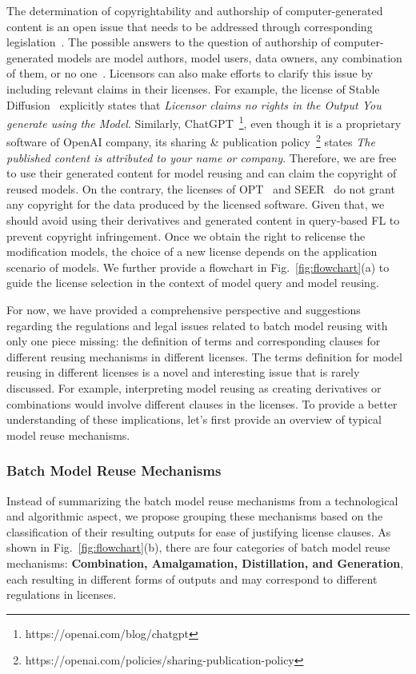 The determination of copyrightability and authorship of computer-generated content is an open issue that needs to be addressed through corresponding legislation~\cite{national1979final, hedrick2019ithink, margoni2018artificial}.
The possible answers to the question of authorship of computer-generated models are model authors, model users, data owners, any combination of them, or no one~\cite{hedrick2019ithink}.
Licensors can also make efforts to clarify this issue by including relevant claims in their licenses.
For example, the license of Stable Diffusion~\cite{rombach2022high} explicitly states that \textit{Licensor claims no rights in the Output You generate using the Model}. 
Similarly, ChatGPT~\footnote{https://openai.com/blog/chatgpt}, even though it is a proprietary software of OpenAI company, its sharing \& publication policy~\footnote{https://openai.com/policies/sharing-publication-policy} states \textit{The published content is attributed to your name or company}.
Therefore, we are free to use their generated content for model reusing and can claim the copyright of reused models.
On the contrary, the licenses of OPT~\cite{zhang2022opt} and SEER~\cite{goyal2022vision} do not grant any copyright for the data produced by the licensed software. 
Given that, we should avoid using their derivatives and generated content in query-based FL to prevent copyright infringement.
Once we obtain the right to relicense the modification models, the choice of a new license depends on the application scenario of models. 
We further provide a flowchart in Fig.~\ref{fig:flowchart}(a) to guide the license selection in the context of model query and model reusing.

For now, we have provided a comprehensive perspective and suggestions regarding the regulations and legal issues related to batch model reusing with only one piece missing: the definition of terms and corresponding clauses for different reusing mechanisms in different licenses.
The terms definition for model reusing in different licenses is a novel and interesting issue that is rarely discussed. 
For example, interpreting model reusing as creating derivatives or combinations would involve different clauses in the licenses.
To provide a better understanding of these implications, let's first provide an overview of typical model reuse mechanisms.

\subsubsection{Batch Model Reuse Mechanisms}
\label{sec:taxonomy}
Instead of summarizing the batch model reuse mechanisms from a technological and algorithmic aspect, we propose grouping these mechanisms based on the classification of their resulting outputs for ease of justifying license clauses.
As shown in Fig.~\ref{fig:flowchart}(b), there are four categories of batch model reuse mechanisms: \textbf{Combination, Amalgamation, Distillation, and Generation}, each resulting in different forms of outputs and may correspond to different regulations in licenses.

